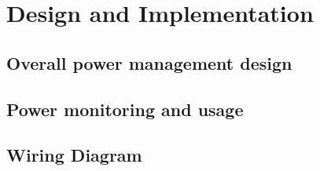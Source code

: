\section{Design and Implementation}
\subsection{Overall power management design}
\subsection{Power monitoring and usage}
\subsection{Wiring Diagram}